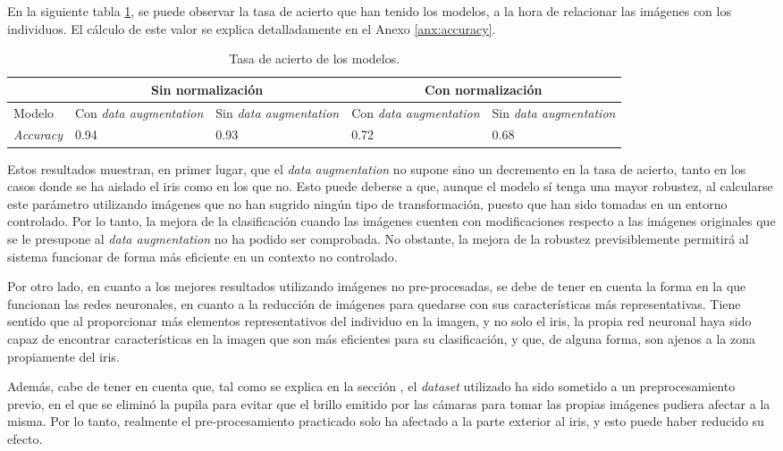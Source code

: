 En la siguiente tabla \ref{tabla:tasa-acierto-modelos}, se puede observar la tasa de acierto que han tenido los modelos, a la hora de relacionar las imágenes
 con los individuos. El cálculo de este valor se explica detalladamente en el Anexo \ref{anx:accuracy}.

\begin{table}[h!]
\begin{tabular}{ |p{2cm}||p{2cm}|p{2cm}|p{2cm}|p{2cm}|  }
    \hline
     & \multicolumn{2}{|c|}{Sin normalización} & \multicolumn{2}{|c|}{Con normalización} \\
    \hline
    Modelo& Con \textit{data augmentation} & Sin \textit{data augmentation} &Con \textit{data augmentation}&Sin \textit{data augmentation}\\
    \hline
    \textit{Accuracy} & 0.94   & 0.93    & 0.72 &   0.68\\
    \hline
   \end{tabular}
   \caption{\label{tabla:tasa-acierto-modelos}Tasa de acierto de los modelos.}
\end{table}


Estos resultados muestran, en primer lugar, que el \textit{data augmentation} no supone sino un decremento en la tasa de acierto, tanto en los casos donde se ha aislado el iris
como en los que no. Esto puede deberse a que, aunque el modelo sí tenga una mayor robustez, al calcularse este parámetro utilizando imágenes que no han sugrido ningún tipo de transformación, puesto que han sido tomadas en un entorno controlado.
Por lo tanto, la mejora de la clasificación cuando las imágenes cuenten con modificaciones respecto a las imágenes originales que se le presupone al \textit{data augmentation} no ha podido ser comprobada. No obstante, la mejora de la robustez previsiblemente
permitirá al sistema funcionar de forma más eficiente en un contexto no controlado.

Por otro lado, en cuanto a los mejores resultados utilizando imágenes no pre-procesadas, se debe de tener en cuenta la forma en la que funcionan las redes neuronales,
en cuanto a la reducción de imágenes para quedarse con sus características más representativas. Tiene sentido que al proporcionar más elementos representativos del individuo en la imagen,
y no solo el iris, la propia red neuronal haya sido capaz de encontrar características en la imagen que son más eficientes para su clasificación, y que, de alguna forma, son
ajenos a la zona propiamente del iris.

Además, cabe de tener en cuenta que, tal como se explica en la sección , el \textit{dataset} utilizado ha sido sometido a un preprocesamiento previo, en el que se eliminó la pupila 
para evitar que el brillo emitido por las cámaras para tomar las propias imágenes pudiera afectar a la misma. Por lo tanto, realmente el pre-procesamiento practicado solo ha afectado a la 
parte exterior al iris, y esto puede haber reducido su efecto.

